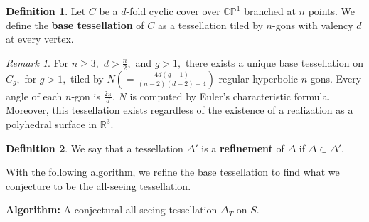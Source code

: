 \documentclass[12pt,reqno]{amsart}
\newenvironment{dami}{
  \medskip
\begin{color}{blue}
    \textcolor{purple}{\textbf{Dami:}} 
}{
\end{color}
  \medskip
}
\DeclareMathOperator{\Aut}{Aut}
\newcommand{\R}{\mathbb{R}}
\theoremstyle{definition}
\newtheorem{defn}{Definition}
\theoremstyle{remark}
\newtheorem*{remark}{Remark}
\newcommand{\DD}{\Delta\kern -8.3pt {\diamond} \kern -4.5pt \cdot \:}
\begin{document}


\begin{defn} \label{defn: base tess} Let $C$ be a $d$-fold cyclic cover over $\mathbb{C}\mathbb{P}^1$ branched at $n$ points. We define the \textbf{base tessellation} of $C$ as a tessellation tiled by $n$-gons with valency $d$ at every vertex. \end{defn}

\begin{remark} For $n \geq 3,$ $d > \frac{n}{2},$ and $g > 1,$ there exists a unique base tessellation on $C_g,$ for $g > 1,$ tiled by $N (= \frac{4 d (g - 1)}{(n - 2) (d - 2) - 4})$ regular hyperbolic $n$-gons. Every angle of each $n$-gon is $\frac{2 \pi}{d}.$ $N$ is computed by Euler's characteristic formula. Moreover, this tessellation exists regardless of the existence of a realization as a polyhedral surface in $\R^3.$
 \end{remark}



\begin{defn} We say that a tessellation $\Delta'$ is a \textbf{refinement} of $\Delta$ if $\Delta \subset \Delta'$. \end{defn}

With the following algorithm, we refine the base tessellation to find what we conjecture to be the all-seeing tessellation. 

\vspace{+7pt}


\textbf{Algorithm:} A conjectural all-seeing tessellation $\Delta_T$ on $S$.


\end{document}
